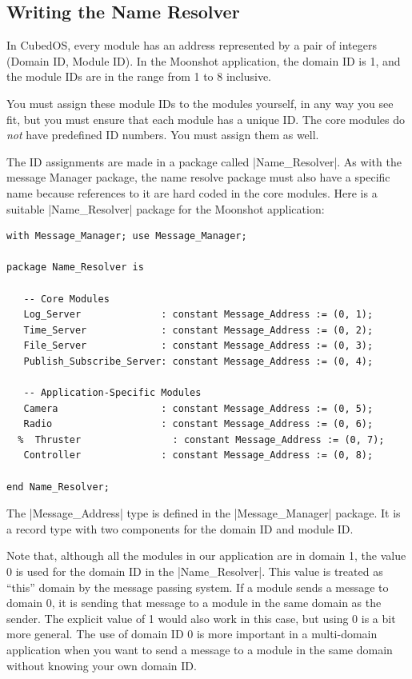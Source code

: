 \subsection{Writing the Name Resolver}
\label{sec:manual-tutorial-name-resolver}

In CubedOS, every module has an address represented by a pair of integers (Domain ID, Module
ID). In the Moonshot application, the domain ID is 1, and the module IDs are in the range from 1
to 8 inclusive.

You must assign these module IDs to the modules yourself, in any way you see fit, but you must
ensure that each module has a unique ID. The core modules do \emph{not} have predefined ID
numbers. You must assign them as well.

The ID assignments are made in a package called |Name_Resolver|. As with the message Manager
package, the name resolve package must also have a specific name because references to it are
hard coded in the core modules. Here is a suitable |Name_Resolver| package for the Moonshot
application:

\begin{verbatim}
with Message_Manager; use Message_Manager;

package Name_Resolver is

   -- Core Modules
   Log_Server              : constant Message_Address := (0, 1);
   Time_Server             : constant Message_Address := (0, 2);
   File_Server             : constant Message_Address := (0, 3);
   Publish_Subscribe_Server: constant Message_Address := (0, 4);

   -- Application-Specific Modules
   Camera                  : constant Message_Address := (0, 5);
   Radio                   : constant Message_Address := (0, 6);
  %  Thruster                : constant Message_Address := (0, 7);
   Controller              : constant Message_Address := (0, 8);

end Name_Resolver;
\end{verbatim}

The |Message_Address| type is defined in the |Message_Manager| package. It is a record type with
two components for the domain ID and module ID.

Note that, although all the modules in our application are in domain 1, the value 0 is used for
the domain ID in the |Name_Resolver|. This value is treated as ``this'' domain by the message
passing system. If a module sends a message to domain 0, it is sending that message to a module
in the same domain as the sender. The explicit value of 1 would also work in this case, but
using 0 is a bit more general. The use of domain ID 0 is more important in a multi-domain
application when you want to send a message to a module in the same domain without knowing your
own domain ID.

